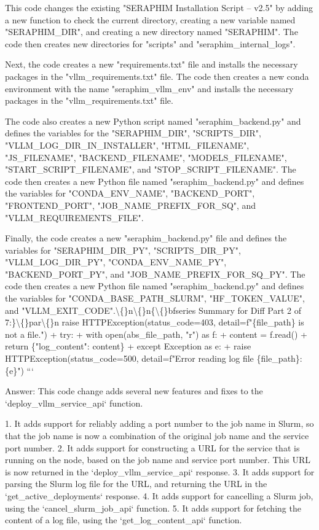 \documentclass{article}
\begin{document}
{This code changes the existing "SERAPHIM Installation Script -- v2.5" by adding a new function to check the current directory, creating a new variable named "SERAPHIM\_DIR", and creating a new directory named "SERAPHIM". The code then creates new directories for "scripts" and "seraphim\_internal\_logs".

Next, the code creates a new "requirements.txt" file and installs the necessary packages in the "vllm\_requirements.txt" file. The code then creates a new conda environment with the name "seraphim\_vllm\_env" and installs the necessary packages in the "vllm\_requirements.txt" file.

The code also creates a new Python script named "seraphim\_backend.py" and defines the variables for the "SERAPHIM\_DIR", "SCRIPTS\_DIR", "VLLM\_LOG\_DIR\_IN\_INSTALLER", "HTML\_FILENAME", "JS\_FILENAME", "BACKEND\_FILENAME", "MODELS\_FILENAME", "START\_SCRIPT\_FILENAME", and "STOP\_SCRIPT\_FILENAME". The code then creates a new Python file named "seraphim\_backend.py" and defines the variables for "CONDA\_ENV\_NAME", "BACKEND\_PORT", "FRONTEND\_PORT", "JOB\_NAME\_PREFIX\_FOR\_SQ", and "VLLM\_REQUIREMENTS\_FILE".

Finally, the code creates a new "seraphim\_backend.py" file and defines the variables for "SERAPHIM\_DIR\_PY", "SCRIPTS\_DIR\_PY", "VLLM\_LOG\_DIR\_PY", "CONDA\_ENV\_NAME\_PY", "BACKEND\_PORT\_PY", and "JOB\_NAME\_PREFIX\_FOR\_SQ\_PY". The code then creates a new Python file named "seraphim\_backend.py" and defines the variables for "CONDA\_BASE\_PATH\_SLURM", "HF\_TOKEN\_VALUE", and "VLLM\_EXIT\_CODE".\textbackslash\{\}n\textbackslash\{\}n\{\textbackslash\{\}bfseries Summary for Diff Part 2 of 7:\}\textbackslash\{\}par\textbackslash\{\}n  raise HTTPException(status\_code=403, detail=f"\{file\_path\} is not a file.")
+    try:
+        with open(abs\_file\_path, "r") as f:
+            content = f.read()
+        return \{"log\_content": content\}
+    except Exception as e:
+        raise HTTPException(status\_code=500, detail=f"Error reading log file \{file\_path\}: \{e\}")
```

Answer: This code change adds several new features and fixes to the `deploy\_vllm\_service\_api` function.

1. It adds support for reliably adding a port number to the job name in Slurm, so that the job name is now a combination of the original job name and the service port number.
2. It adds support for constructing a URL for the service that is running on the node, based on the job name and service port number. This URL is now returned in the `deploy\_vllm\_service\_api` response.
3. It adds support for parsing the Slurm log file for the URL, and returning the URL in the `get\_active\_deployments` response.
4. It adds support for cancelling a Slurm job, using the `cancel\_slurm\_job\_api` function.
5. It adds support for fetching the content of a log file, using the `get\_log\_content\_api` function.

}
\end{document}
